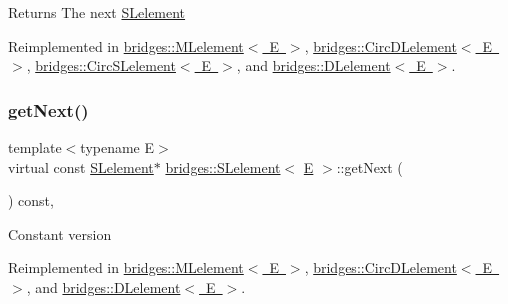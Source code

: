 \begin{DoxyReturn}{Returns}
The next \mbox{\hyperlink{classbridges_1_1_s_lelement}{S\+Lelement}} 
\end{DoxyReturn}


Reimplemented in \mbox{\hyperlink{classbridges_1_1_m_lelement_aceebd292e7d497f44eea5c4845e7709f}{bridges\+::\+M\+Lelement$<$ E $>$}}, \mbox{\hyperlink{classbridges_1_1_circ_d_lelement_a52996d42efc5680d1f8b406143abfee5}{bridges\+::\+Circ\+D\+Lelement$<$ E $>$}}, \mbox{\hyperlink{classbridges_1_1_circ_s_lelement_aab863627c125c6f1075af7e7b7f340cf}{bridges\+::\+Circ\+S\+Lelement$<$ E $>$}}, and \mbox{\hyperlink{classbridges_1_1_d_lelement_a0c713707d8c7d0a97fe4194ed6592ede}{bridges\+::\+D\+Lelement$<$ E $>$}}.

\mbox{\label{classbridges_1_1_s_lelement_a4422b7731a84734d312b8cd8e241b1e8}} 
\subsubsection{\texorpdfstring{getNext()}{getNext()}\hspace{0.1cm}{\footnotesize\ttfamily [2/2]}}
{\footnotesize\ttfamily template$<$typename E$>$ \\
virtual const \mbox{\hyperlink{classbridges_1_1_s_lelement}{S\+Lelement}}$\ast$ \mbox{\hyperlink{classbridges_1_1_s_lelement}{bridges\+::\+S\+Lelement}}$<$ \mbox{\hyperlink{namespacebridges_acfb0a4f7877d8f63de3e6862004c50eda3a3ea00cfc35332cedf6e5e9a32e94da}{E}} $>$\+::get\+Next (\begin{DoxyParamCaption}{ }\end{DoxyParamCaption}) const\hspace{0.3cm}{\ttfamily [inline]}, {\ttfamily [virtual]}}

Constant version 

Reimplemented in \mbox{\hyperlink{classbridges_1_1_m_lelement_aef3e5750e334331597bce94710745d1e}{bridges\+::\+M\+Lelement$<$ E $>$}}, \mbox{\hyperlink{classbridges_1_1_circ_d_lelement_ac266d60bd2f7ce92cb38a12875a6a468}{bridges\+::\+Circ\+D\+Lelement$<$ E $>$}}, and \mbox{\hyperlink{classbridges_1_1_d_lelement_a648012849263b4b1cd2d504d5e5fd880}{bridges\+::\+D\+Lelement$<$ E $>$}}.

\mbox{\label{classbridges_1_1_s_lelement_a347f8809406f930ce83bf44764a4f1b5}} 
